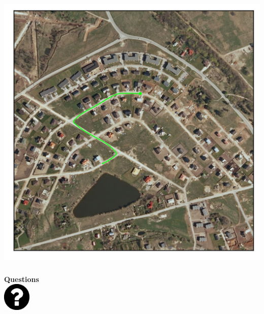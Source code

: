\documentclass[usenames,dvipsnames,10pt]{beamer}
\begin{document}
\begin{frame}
\begin{minipage}[]{0.3\textwidth}
\end{minipage}
\hspace{0.25cm}
\begin{minipage}[]{0.3\textwidth}
	\centering
	\includegraphics[width=\textwidth]{graphics/path-1}
\end{minipage}
\end{frame}

\begin{frame}
\frametitle{}
\framesubtitle{}
\begin{center}
\textbf{Questions} \\[0.25cm]
\vspace{0cm}
\includegraphics[width=0.1\textwidth]{graphics/question.png}
\end{center}
\end{frame}
\end{document}
